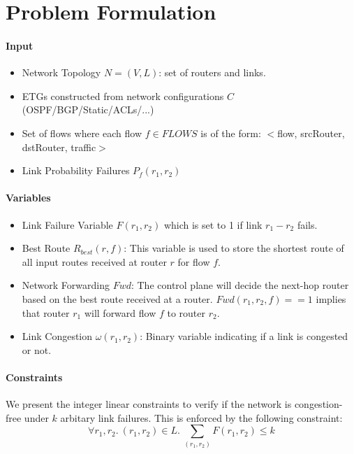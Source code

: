 \documentclass[]{article}
\begin{document}
\section{Problem Formulation}
\noindent\paragraph{Input}
\begin{itemize}
\item Network Topology $N = (V, L)$: set of routers and links. 
\item ETGs constructed from network configurations $C$ (OSPF/BGP/Static/ACLs/...)
\item Set of flows where 
each flow $f \in FLOWS$ is of the form: $<$flow, srcRouter, dstRouter, traffic$>$\
\item Link Probability Failures $P_f(r_1, r_2)$
\end{itemize}
\noindent\paragraph{Variables}
\begin{itemize}
\item Link Failure Variable $F(r_1, r_2)$ which is set to 1 if link $r_1 - r_2$ fails.

\item Best Route $R_{best}(r, f)$: This variable is used to store the shortest route  
of all input routes received at router $r$ for flow $f$.

\item Network Forwarding $Fwd$: The control plane will decide the next-hop 
router based on the best route received at a router.  
$Fwd(r_1, r_2, f)== 1$ implies that router $r_1$ will forward flow $f$ to router $r_2$.

\item Link Congestion $\omega(r_1, r_2)$: Binary variable indicating if a 
link is congested or not.  
\end{itemize}

\noindent\paragraph{Constraints}
We present the integer linear constraints to verify if the network 
is congestion-free under $k$ arbitary link failures. This is 
enforced by the following constraint:
\begin{equation}
	\forall r_1, r_2.~(r_1,r_2) \in L. ~\sum_{(r_1, r_2)} F(r_1, r_2) \leq k
\end{equation}
\end{document}
